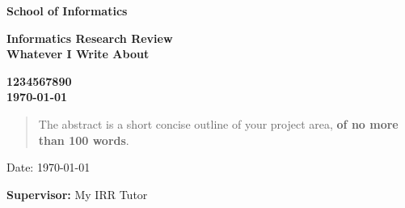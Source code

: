 \documentclass[a4paper,11pt]{article}
\newcommand{\examnumber}{1234567890}
\newcommand{\field}{Whatever I Write About}
\newcommand{\supervisor}{My IRR Tutor}
\begin{document}
\begin{minipage}[b]{110mm}
        {\Huge\bf School of Informatics
        \vspace*{17mm}}
\end{minipage}
\hfill
\begin{minipage}[t]{40mm}               
\end{minipage}
\par\noindent
\vspace*{2cm}
\begin{center}
        \Large\bf Informatics Research Review \\
        \Large\bf \field
\end{center}
\vspace*{1.5cm}
\begin{center}
        \bf \examnumber\\
        \monthyeardate\today
\end{center}
\vspace*{5mm}

%
%                       
\begin{abstract}
        The abstract is a short concise outline of your 
        project area, {\bf of no more than 100 words}.
\end{abstract}

\vspace*{1cm}

\vspace*{3cm}
Date: \today

\vfill
{\bf Supervisor:} \supervisor
\newpage

\setcounter{page}{1}                            %
\footruleheight{1pt}
\headruleheight{1pt}
\rhead{- \thepage}
\cfoot{}
%
\end{document}

